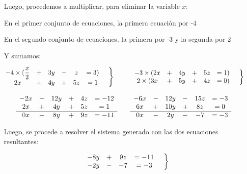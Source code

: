     Luego, procedemos a multiplicar, para eliminar la variable $x$:

    En el primer conjunto de ecuaciones, la primera ecuación por -4

    En el segundo conjunto de ecuaciones, la primera por -3 y la segunda por 2

    Y sumamos:

   \begin{align*}
        \left.
        \begin{matrix}
           -4\times(\displaystyle\frac{x}{2} &+& 3y &-& z &= 3) \\
            2x &+& 4y &+&5z &= 1\\
        \end{matrix}
        \hspace*{0.5cm}\right\rbrace\hspace*{1cm}&
        \left.
        \begin{matrix}
            -3\times(2x &+& 4y &+&5z &= 1)\\
            2\times(3x &+& 5y &+& 4z &=0)
        \end{matrix}
        \hspace*{0.5cm}\right\rbrace
    \end{align*}




   \begin{align*}
        \begin{matrix}
           -2x &-& 12y &+& 4z &= -12 \\
            2x &+& 4y &+&5z &= 1\\
            \hline
            0x &-& 8y &+&9z &= -11
        \end{matrix}
        \hspace*{1cm}&
        \begin{matrix}
            -6x &-& 12y &-&15z &= -3\\
            6x &+& 10y &+& 8z &=0\\
            \hline
            0x &-&2y &-&-7 &= -3
        \end{matrix}
   \end{align*}

   Luego, se procede a resolver el sistema generado con las dos ecuaciones resultantes:


    \begin{equation*}
        \left.
        \begin{matrix}
           -8y &+&9z &= -11\\
            -2y &-&-7 &= -3
        \end{matrix}
        \hspace*{0.5cm}\right\rbrace
    \end{equation*}

